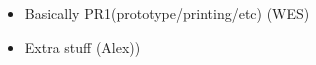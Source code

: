 \color{red}
\begin{itemize}
\item Basically PR1(prototype/printing/etc) (WES)
\item Extra stuff (Alex))
\end{itemize}
\color{black}